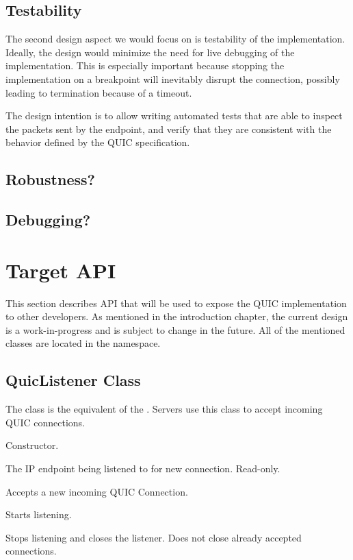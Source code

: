 \subsection{Testability}

The second design aspect we would focus on is testability of the implementation. Ideally, the design
would minimize the need for live debugging of the implementation. This is especially important
because stopping the implementation on a breakpoint will inevitably disrupt the connection, possibly
leading to termination because of a timeout.

The design intention is to allow writing automated tests that are able to inspect the packets sent
by the endpoint, and verify that they are consistent with the behavior defined by the QUIC
specification.

\subsection{Robustness?}


\subsection{Debugging?}


\section{Target \dotnet{} API}

This section describes API that will be used to expose the QUIC implementation to other developers.
As mentioned in the introduction chapter, the current design is a work-in-progress and is subject to
change in the future. All of the mentioned classes are located in the 
namespace.

\subsection{QuicListener Class}

The  class is the equivalent of the . Servers use this
class to accept incoming QUIC connections.

\begin{description}

     Constructor.

     The IP endpoint being listened to for new connection. Read-only.

    Accepts a new incoming QUIC Connection.

     Starts listening.

     Stops listening and closes the listener. Does not close already accepted connections.

\end{description}

